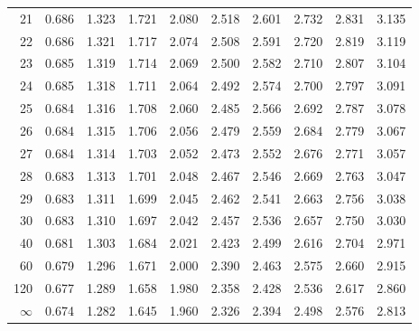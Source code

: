 \begin{mvtable}
{\begin{tabular}{r|*{9}{r}}
21 & 0.686 & 1.323 & 1.721 & 2.080 & 2.518 & 2.601 & 2.732 & 2.831 & 3.135\\
22 & 0.686 & 1.321 & 1.717 & 2.074 & 2.508 & 2.591 & 2.720 & 2.819 & 3.119\\
23 & 0.685 & 1.319 & 1.714 & 2.069 & 2.500 & 2.582 & 2.710 & 2.807 & 3.104\\
24 & 0.685 & 1.318 & 1.711 & 2.064 & 2.492 & 2.574 & 2.700 & 2.797 & 3.091\\
25 & 0.684 & 1.316 & 1.708 & 2.060 & 2.485 & 2.566 & 2.692 & 2.787 & 3.078\\
26 & 0.684 & 1.315 & 1.706 & 2.056 & 2.479 & 2.559 & 2.684 & 2.779 & 3.067\\
27 & 0.684 & 1.314 & 1.703 & 2.052 & 2.473 & 2.552 & 2.676 & 2.771 & 3.057\\
28 & 0.683 & 1.313 & 1.701 & 2.048 & 2.467 & 2.546 & 2.669 & 2.763 & 3.047\\
29 & 0.683 & 1.311 & 1.699 & 2.045 & 2.462 & 2.541 & 2.663 & 2.756 & 3.038\\
30 & 0.683 & 1.310 & 1.697 & 2.042 & 2.457 & 2.536 & 2.657 & 2.750 & 3.030\\
40 & 0.681 & 1.303 & 1.684 & 2.021 & 2.423 & 2.499 & 2.616 & 2.704 & 2.971\\
60 & 0.679 & 1.296 & 1.671 & 2.000 & 2.390 & 2.463 & 2.575 & 2.660 & 2.915\\
120 & 0.677 & 1.289 & 1.658 & 1.980 & 2.358 & 2.428 & 2.536 & 2.617 & 2.860\\
$\infty$ & 0.674 & 1.282 & 1.645 & 1.960 & 2.326 & 2.394 & 2.498 & 2.576 & 2.813\\
\bottomrule
\end{tabular}}
\end{mvtable}
